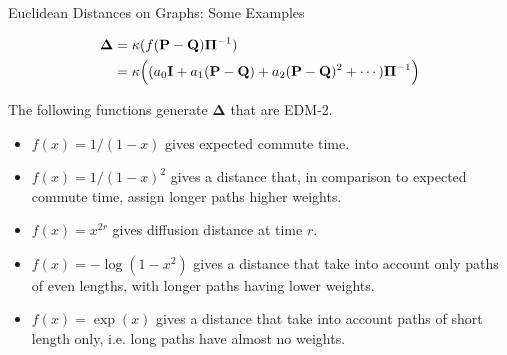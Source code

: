 \documentclass[professionalfonts, hyperref={pdfpagelabels=false,
  colorlinks=true, linkcolor=purple}]{beamer}
\begin{document}
\begin{frame}{Euclidean Distances on Graphs: Some Examples}
  \begin{alertblock}{}
    \begin{equation*}
      \begin{split}
        \bm{\Delta} &= \kappa(f(\mathbf{P} - \mathbf{Q}) \bm{\Pi}^{-1}) \\ 
        &= \kappa\Bigl((a_0
        \mathbf{I} + a_1 (\mathbf{P} - \mathbf{Q}) + a_2 (\mathbf{P} -
        \mathbf{Q})^2 + \cdots)\bm{\Pi}^{-1}\Bigr)
      \end{split}
    \end{equation*}
  \end{alertblock}

  \vskip 10pt The following functions generate $\bm{\Delta}$ that are
  EDM-2.
  \begin{itemize}
  \item $f(x) = 1/(1-x)$ gives expected commute time.
  \item $f(x) = 1/(1-x)^2$ gives a distance that, in comparison to
    expected commute time, assign longer paths higher weights.
  \item $f(x) = x^{2r}$ gives diffusion distance at time $r$.
  \item $f(x) = - \log{(1-x^2)}$ gives a distance that 
    take into account only paths of even lengths, with longer paths having
    lower weights.
  \item $f(x) = \exp(x)$ gives a distance that take into
    account paths of short length only, i.e. long paths have almost
    no weights.
  \end{itemize}
  \end{frame}


\end{document}
